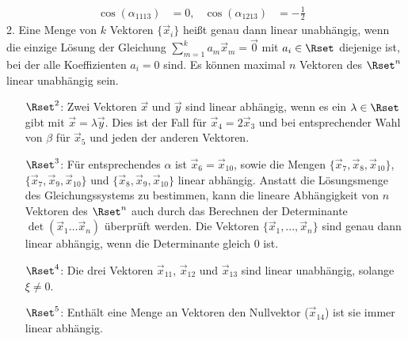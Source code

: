 \documentclass[11pt]{exam}
\begin{document}
\begin{questions}
\begin{solution}
\begin{align*}
		\cos(\alpha_{1113})&=0,&
		\cos(\alpha_{1213})&=-\frac{1}{2}&
	\end{align*}
	2. Eine Menge von $k$ Vektoren $\{\vec{x}_i\}$ heißt genau dann linear unabhängig, wenn die einzige Lösung der Gleichung $\sum_{m=1}^{k}a_m\vec{x}_m=\vec{0}$ mit $a_i\in\Rset$ diejenige ist, bei der alle Koeffizienten $a_i=0$ sind. Es können maximal $n$ Vektoren des $\Rset^n$ linear unabhängig sein.
	\begin{enumerate}
		\item[$\Rset^2$:] Zwei Vektoren $\vec{x}$ und $\vec{y}$ sind linear abhängig, wenn es ein $\lambda\in\Rset$ gibt mit $\vec{x}=\lambda\vec{y}$. Dies ist der Fall für $\vec{x}_4=2\vec{x}_3$ und bei entsprechender Wahl von $\beta$ für $\vec{x}_5$ und jeden der anderen Vektoren.\\
		\item[$\Rset^3$:] Für entsprechendes $\alpha$ ist $\vec{x}_6=\vec{x}_{10}$, sowie die Mengen $\{\vec{x}_7,\vec{x}_8,\vec{x}_{10}\}$, $\{\vec{x}_7,\vec{x}_9,\vec{x}_{10}\}$ und $\{\vec{x}_8,\vec{x}_9,\vec{x}_{10}\}$ linear abhängig. Anstatt die Lösungsmenge des Gleichungssystems zu bestimmen, kann die lineare Abhängigkeit von $n$ Vektoren des $\Rset^n$ auch durch das Berechnen der Determinante $\det\left(\vec{x}_1\dots\vec{x}_n\right)$ überprüft werden. Die Vektoren $\{\vec{x}_1, ..., \vec{x}_n\}$ sind genau dann linear abhängig, wenn die Determinante gleich 0 ist.\\
		\item[$\Rset^4$:] Die drei Vektoren $\vec{x}_{11}$, $\vec{x}_{12}$ und $\vec{x}_{13}$ sind linear unabhängig, solange $\xi\neq0$.\\
		\item[$\Rset^5$:] Enthält eine Menge an Vektoren den Nullvektor ($\vec{x}_{14}$) ist sie immer linear abhängig.
	\end{enumerate}
\end{solution}





\end{questions}
\end{document}
